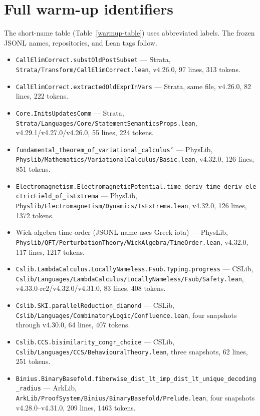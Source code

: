 \documentclass{article}
\begin{document}
{
\small


}

\appendix
\section{Full warm-up identifiers}
\label{app-ids}

The short-name table (Table~\ref{warmup-table}) uses abbreviated labels. The frozen JSONL names, repositories, and Lean tags follow.

\sloppy
\begin{itemize}\raggedright
  \item \texttt{CallElimCorrect.substOldPostSubset} --- Strata, \texttt{Strata/Transform/CallElimCorrect.lean}, v4.26.0, 97 lines, 313 tokens.
  \item \texttt{CallElimCorrect.extractedOldExprInVars} --- Strata, same file, v4.26.0, 82 lines, 222 tokens.
  \item \texttt{Core.InitsUpdatesComm} --- Strata, \texttt{Strata/Languages/Core/\allowbreak StatementSemanticsProps.lean}, v4.29.1/v4.27.0/v4.26.0, 55 lines, 224 tokens.
  \item \texttt{fundamental\_theorem\_of\_variational\_calculus'} --- PhysLib, \texttt{Physlib/Mathematics/\allowbreak VariationalCalculus/Basic.lean}, v4.32.0, 126 lines, 851 tokens.
  \item \texttt{Electromagnetism.ElectromagneticPotential.\allowbreak time\_deriv\_time\_deriv\_electricField\_of\_isExtrema} --- PhysLib, \texttt{Physlib/Electromagnetism/Dynamics/IsExtrema.lean}, v4.32.0, 126 lines, 1372 tokens.
  \item Wick-algebra time-order (JSONL name uses Greek iota) --- PhysLib, \texttt{Physlib/QFT/\allowbreak PerturbationTheory/WickAlgebra/TimeOrder.lean}, v4.32.0, 117 lines, 1217 tokens.
  \item \texttt{Cslib.LambdaCalculus.LocallyNameless.\allowbreak Fsub.Typing.progress} --- CSLib, \texttt{Cslib/Languages/\allowbreak LambdaCalculus/LocallyNameless/Fsub/Safety.lean}, v4.33.0-rc2/v4.32.0/v4.31.0, 83 lines, 408 tokens.
  \item \texttt{Cslib.SKI.parallelReduction\_diamond} --- CSLib, \texttt{Cslib/Languages/\allowbreak CombinatoryLogic/Confluence.lean}, four snapshots through v4.30.0, 64 lines, 407 tokens.
  \item \texttt{Cslib.CCS.bisimilarity\_congr\_choice} --- CSLib, \texttt{Cslib/Languages/CCS/\allowbreak BehaviouralTheory.lean}, three snapshots, 62 lines, 251 tokens.
  \item \texttt{Binius.BinaryBasefold.\allowbreak fiberwise\_dist\_lt\_imp\_dist\_lt\_unique\_decoding\_radius} --- ArkLib, \texttt{ArkLib/ProofSystem/\allowbreak Binius/BinaryBasefold/Prelude.lean}, four snapshots v4.28.0--v4.31.0, 209 lines, 1463 tokens.

\end{itemize}
\end{document}
